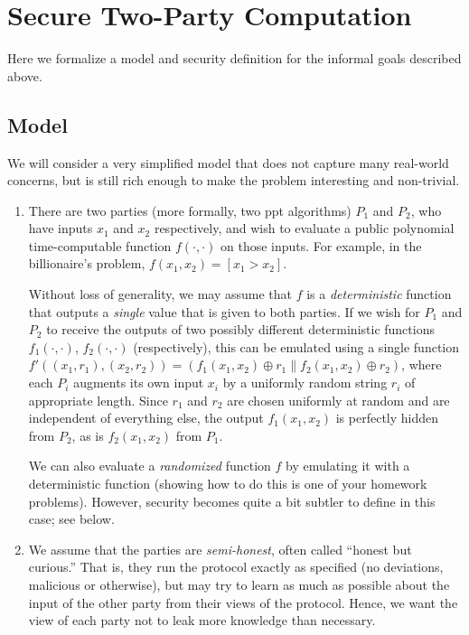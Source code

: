 \documentclass[11pt]{article}
\begin{document}
\section{Secure Two-Party Computation}
\label{sec:2pc}

Here we formalize a model and security definition for the informal
goals described above.

\subsection{Model}
\label{sec:model}

We will consider a very simplified model that does not capture many
real-world concerns, but is still rich enough to make the problem
interesting and non-trivial.

\begin{enumerate}
\item There are two parties (more formally, two ppt algorithms) $P_1$
  and $P_2$, who have inputs $x_1$ and $x_2$ respectively, and wish to
  evaluate a public polynomial time-computable function
  $f(\cdot,\cdot)$ on those inputs.  For example, in the billionaire's
  problem, $f(x_{1}, x_{2}) = [x_{1} > x_{2}]$.

  Without loss of generality, we may assume that $f$ is a
  \emph{deterministic} function that outputs a \emph{single} value
  that is given to both parties.  If we wish for $P_{1}$ and $P_{2}$
  to receive the outputs of two possibly different deterministic
  functions $f_{1}(\cdot, \cdot)$, $f_{2}(\cdot,\cdot)$
  (respectively), this can be emulated using a single function
  $f'((x_1,r_1),(x_2,r_2)) = (f_1(x_1,x_2) \oplus r_1 \| f_2(x_1,x_2)
  \oplus r_2 )$, where each $P_{i}$ augments its own input $x_{i}$ by
  a uniformly random string $r_{i}$ of appropriate length.  Since
  $r_1$ and $r_2$ are chosen uniformly at random and are independent
  of everything else, the output $f_{1}(x_{1}, x_{2})$ is perfectly
  hidden from $P_{2}$, as is $f_{2}(x_{1}, x_{2})$ from $P_{1}$.

  We can also evaluate a \emph{randomized} function $f$ by emulating
  it with a deterministic function (showing how to do this is one of
  your homework problems).  However, security becomes quite a bit
  subtler to define in this case; see below.

\item We assume that the parties are {\em semi-honest}, often called
  ``honest but curious.''  That is, they run the protocol exactly as
  specified (no deviations, malicious or otherwise), but may try to
  learn as much as possible about the input of the other party from
  their views of the protocol.  Hence, we want the view of each party
  not to leak more knowledge than necessary.


\end{enumerate}
\end{document}
